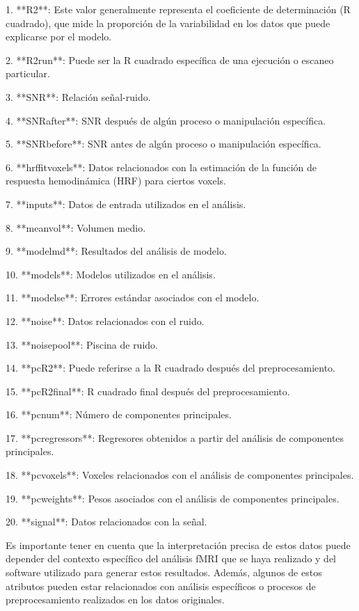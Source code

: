 \documentclass{article}
\begin{document}
	1. **R2**: Este valor generalmente representa el coeficiente de determinación (R cuadrado), que mide la proporción de la variabilidad en los datos que puede explicarse por el modelo.
	
	2. **R2run**: Puede ser la R cuadrado específica de una ejecución o escaneo particular.
	
	3. **SNR**: Relación señal-ruido.
	
	4. **SNRafter**: SNR después de algún proceso o manipulación específica.
	
	5. **SNRbefore**: SNR antes de algún proceso o manipulación específica.
	
	6. **hrffitvoxels**: Datos relacionados con la estimación de la función de respuesta hemodinámica (HRF) para ciertos voxels.
	
	7. **inputs**: Datos de entrada utilizados en el análisis.
	
	8. **meanvol**: Volumen medio.
	
	9. **modelmd**: Resultados del análisis de modelo.
	
	10. **models**: Modelos utilizados en el análisis.
	
	11. **modelse**: Errores estándar asociados con el modelo.
	
	12. **noise**: Datos relacionados con el ruido.
	
	13. **noisepool**: Piscina de ruido.
	
	14. **pcR2**: Puede referirse a la R cuadrado después del preprocesamiento.
	
	15. **pcR2final**: R cuadrado final después del preprocesamiento.
	
	16. **pcnum**: Número de componentes principales.
	
	17. **pcregressors**: Regresores obtenidos a partir del análisis de componentes principales.
	
	18. **pcvoxels**: Voxeles relacionados con el análisis de componentes principales.
	
	19. **pcweights**: Pesos asociados con el análisis de componentes principales.
	
	20. **signal**: Datos relacionados con la señal.
	
	Es importante tener en cuenta que la interpretación precisa de estos datos puede depender del contexto específico del análisis fMRI que se haya realizado y del software utilizado para generar estos resultados. Además, algunos de estos atributos pueden estar relacionados con análisis específicos o procesos de preprocesamiento realizados en los datos originales.
	
\end{document}
